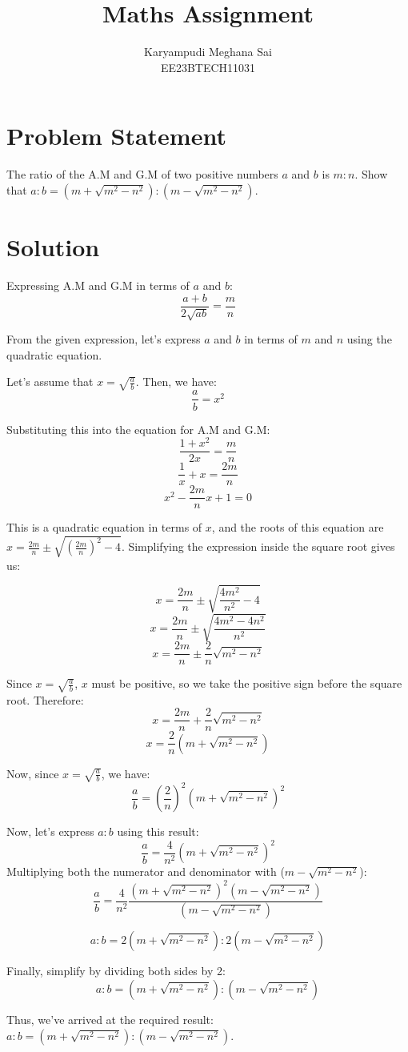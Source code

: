 \documentclass{article}
\begin{document}
\title{Maths Assignment}
\author{Karyampudi Meghana Sai\\
        EE23BTECH11031}
\maketitle
\section*{Problem Statement}

The ratio of the A.M and G.M of two positive numbers $a$ and $b$ is $m:n$. Show that $a:b = \left( m + \sqrt{m^2 - n^2} \right) : \left( m - \sqrt{m^2 - n^2} \right)$.
\section*{Solution}

Expressing A.M and G.M in terms of $a$ and $b$:
\[ \frac{a + b}{2\sqrt{ab}} = \frac{m}{n} \]

From the given expression, let's express $a$ and $b$ in terms of $m$ and $n$ using the quadratic equation.


Let's assume that $x = \sqrt{\frac{a}{b}}$. Then, we have:
\[ \frac{a}{b} = x^2 \]

Substituting this into the equation for A.M and G.M:
\[ \frac{1 + x^2}{2x} = \frac{m}{n} \]
\[ \frac{1}{x} + x = \frac{2m}{n} \]
\[ x^2 - \frac{2m}{n}x + 1 = 0 \]

This is a quadratic equation in terms of $x$, and the roots of this equation are $x = \frac{2m}{n} \pm \sqrt{\left(\frac{2m}{n}\right)^2 - 4}$. Simplifying the expression inside the square root gives us:

\[ x = \frac{2m}{n} \pm \sqrt{\frac{4m^2}{n^2} - 4} \]
\[ x = \frac{2m}{n} \pm \sqrt{\frac{4m^2 - 4n^2}{n^2}} \]
\[ x = \frac{2m}{n} \pm \frac{2}{n} \sqrt{m^2 - n^2} \]

Since $x = \sqrt{\frac{a}{b}}$, $x$ must be positive, so we take the positive sign before the square root. Therefore:
\[ x = \frac{2m}{n} + \frac{2}{n} \sqrt{m^2 - n^2} \]
\[ x = \frac{2}{n}(m + \sqrt{m^2 - n^2}) \]

Now, since $x = \sqrt{\frac{a}{b}}$, we have:
\[ \frac{a}{b} = \left(\frac{2}{n}\right)^2 (m + \sqrt{m^2 - n^2})^2 \]

Now, let's express $a:b$ using this result:
\[ \frac{a}{b} = \frac{4}{n^2}(m + \sqrt{m^2 - n^2})^2 \]
Multiplying both the numerator and denominator with ($m-\sqrt{m^2 - n^2}$): 
\[ \frac{a}{b} = \frac{4}{n^2} \frac{(m + \sqrt{m^2 - n^2})^2  (m-\sqrt{m^2 - n^2})}{(m-\sqrt{m^2 - n^2})}\]

\[ a:b = 2 \left( m + \sqrt{m^2 - n^2} \right) : 2 \left( m - \sqrt{m^2 - n^2} \right) \]

Finally, simplify by dividing both sides by 2:
\[ a:b = \left( m + \sqrt{m^2 - n^2} \right) : \left( m - \sqrt{m^2 - n^2} \right) \]

Thus, we've arrived at the required result: $a:b = \left( m + \sqrt{m^2 - n^2} \right) : \left( m - \sqrt{m^2 - n^2} \right)$.
\end{document}
